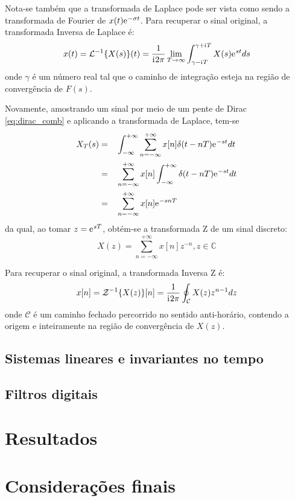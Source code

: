 \documentclass[12pt,a4paper]{report}
\newcommand{\I}{{\mathrm{i}\mkern1mu}}
\newcommand{\euler}{{\mathrm{e}\mkern1mu}}
\begin{document}
  Nota-se também que a transformada de Laplace pode ser vista como sendo a transformada de Fourier de
  $x(t) \euler^{-\sigma t}$. Para recuperar o sinal original, a transformada Inversa de Laplace é:
  \begin{equation}
    x(t) = \mathcal{L}^{-1}\{X(s)\}(t) = \frac{1}{\I 2 \pi} \lim_{T \rightarrow \infty}
    \int_{\gamma - \I T}^{\gamma + \I T} X(s) \euler^{s t} ds
  \end{equation}
  onde $\gamma$ é um número real tal que o caminho de integração esteja na região de convergência de $F(s)$.

  Novamente, amostrando um sinal por meio de um pente de Dirac \eqref{eq:dirac_comb} e aplicando
  a transformada de Laplace, tem-se
  \begin{equation}
    \begin{split}
      X_T(s) = &\quad \int_{-\infty}^{+\infty} \sum_{n = -\infty}^{+\infty} x[n] \delta(t - n T) \euler^{-s t} dt
      \\= &\quad \sum_{n = -\infty}^{+\infty} x[n] \int_{-\infty}^{+\infty} \delta(t - n T) \euler^{-s t} dt
      \\= &\quad \sum_{n = -\infty}^{+\infty} x[n] \euler^{-s n T}
    \end{split}
  \end{equation}
  da qual, ao tomar $z = \euler^{s T}$, obtém-se a transformada Z de um sinal discreto:
  \begin{equation}
    X(z) = \sum_{n = -\infty}^{+\infty} x[n] z^{-n}, z \in \mathbb{C}
  \end{equation}

  Para recuperar o sinal original, a transformada Inversa Z é:
  \begin{equation}
    x[n] = \mathcal{Z}^{-1}\{X(z)\}[n] = \frac{1}{\I 2 \pi} \oint_{\mathcal{C}} X(z) z^{n - 1} dz
  \end{equation}
  onde $\mathcal{C}$ é um caminho fechado percorrido no sentido anti-horário, contendo a origem e inteiramente
  na região de convergência de $X(z)$.
\section{Sistemas lineares e invariantes no tempo}
\section{Filtros digitais}
\chapter{Resultados}
\chapter{Considerações finais}
\printbibliography
\end{document}
